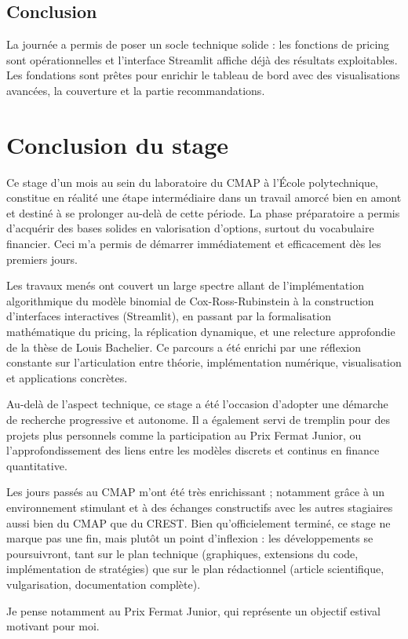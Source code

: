 \documentclass[a4paper,11pt]{article}
\begin{document}
\subsection{Conclusion}
La journée a permis de poser un socle technique solide : les fonctions de pricing sont opérationnelles et l’interface Streamlit affiche déjà des résultats exploitables. Les fondations sont prêtes pour enrichir le tableau de bord avec des visualisations avancées, la couverture et la partie recommandations.

\newpage

\section{Conclusion du stage}

Ce stage d'un mois au sein du laboratoire du CMAP à l’École polytechnique, constitue en réalité une étape intermédiaire dans un travail amorcé bien en amont et destiné à se prolonger au-delà de cette période. La phase préparatoire a permis d’acquérir des bases solides en valorisation d’options, surtout du vocabulaire financier. Ceci m'a permis de démarrer immédiatement et efficacement dès les premiers jours.

Les travaux menés ont couvert un large spectre allant de l’implémentation algorithmique du modèle binomial de Cox-Ross-Rubinstein à la construction d’interfaces interactives (Streamlit), en passant par la formalisation mathématique du pricing, la réplication dynamique, et une relecture approfondie de la thèse de Louis Bachelier. Ce parcours a été enrichi par une réflexion constante sur l’articulation entre théorie, implémentation numérique, visualisation et applications concrètes.

Au-delà de l’aspect technique, ce stage a été l’occasion d’adopter une démarche de recherche progressive et autonome. Il a également servi de tremplin pour des projets plus personnels comme la participation au Prix Fermat Junior, ou l’approfondissement des liens entre les modèles discrets et continus en finance quantitative.

Les jours passés au CMAP m'ont été très enrichissant ; notamment grâce à un environnement stimulant et à des échanges constructifs avec les autres stagiaires aussi bien du CMAP que du CREST. Bien qu'officielement terminé, ce stage ne marque pas une fin, mais plutôt un point d’inflexion : les développements se poursuivront, tant sur le plan technique (graphiques, extensions du code, implémentation de stratégies) que sur le plan rédactionnel (article scientifique, vulgarisation, documentation complète).

Je pense notamment au Prix Fermat Junior, qui représente un objectif estival motivant pour moi.
\end{document}
